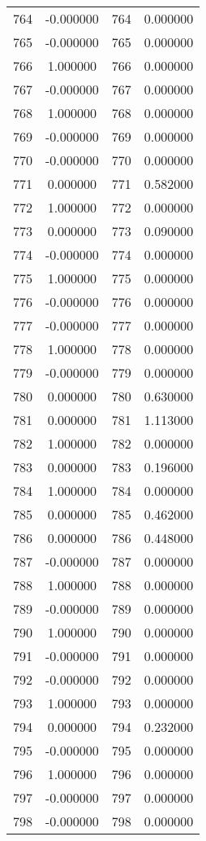 \documentclass[12pt]{article}
\begin{document}
\begin{longtable}{@{}cccc@{}}
764 & -0.000000 & 764 & 0.000000 \\
765 & -0.000000 & 765 & 0.000000 \\
766 & 1.000000 & 766 & 0.000000 \\
767 & -0.000000 & 767 & 0.000000 \\
768 & 1.000000 & 768 & 0.000000 \\
769 & -0.000000 & 769 & 0.000000 \\
770 & -0.000000 & 770 & 0.000000 \\
771 & 0.000000 & 771 & 0.582000 \\
772 & 1.000000 & 772 & 0.000000 \\
773 & 0.000000 & 773 & 0.090000 \\
774 & -0.000000 & 774 & 0.000000 \\
775 & 1.000000 & 775 & 0.000000 \\
776 & -0.000000 & 776 & 0.000000 \\
777 & -0.000000 & 777 & 0.000000 \\
778 & 1.000000 & 778 & 0.000000 \\
779 & -0.000000 & 779 & 0.000000 \\
780 & 0.000000 & 780 & 0.630000 \\
781 & 0.000000 & 781 & 1.113000 \\
782 & 1.000000 & 782 & 0.000000 \\
783 & 0.000000 & 783 & 0.196000 \\
784 & 1.000000 & 784 & 0.000000 \\
785 & 0.000000 & 785 & 0.462000 \\
786 & 0.000000 & 786 & 0.448000 \\
787 & -0.000000 & 787 & 0.000000 \\
788 & 1.000000 & 788 & 0.000000 \\
789 & -0.000000 & 789 & 0.000000 \\
790 & 1.000000 & 790 & 0.000000 \\
791 & -0.000000 & 791 & 0.000000 \\
792 & -0.000000 & 792 & 0.000000 \\
793 & 1.000000 & 793 & 0.000000 \\
794 & 0.000000 & 794 & 0.232000 \\
795 & -0.000000 & 795 & 0.000000 \\
796 & 1.000000 & 796 & 0.000000 \\
797 & -0.000000 & 797 & 0.000000 \\
798 & -0.000000 & 798 & 0.000000 \\

\end{longtable}
\end{document}
